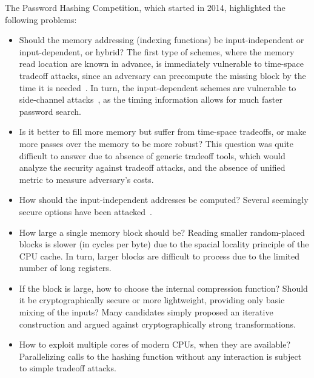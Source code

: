 \documentclass[a4paper]{article}
\begin{document}
The  Password Hashing Competition, which started in 2014,  highlighted the following problems:
\begin{itemize}
  \item Should the memory addressing (indexing functions) be input-independent or input-dependent, or hybrid? The first type of schemes, where the memory read location are known in advance, is immediately vulnerable to time-space tradeoff attacks,
 since an adversary can precompute the missing block by the time it is needed~\cite{trade-att}. In turn, the input-dependent schemes are vulnerable to side-channel attacks~\cite{RistenpartTSS09}, as the timing information allows for much faster password search.
  \item Is it better to fill more memory but suffer from time-space tradeoffs, or make more passes over the memory to be more robust? This question was quite difficult to answer due to absence of generic tradeoff tools, which would analyze the security against tradeoff attacks, and the absence of unified metric to measure adversary's costs.
          \item How should the input-independent addresses be computed? Several seemingly secure options have been attacked~\cite{trade-att}.
  \item How large a single memory block should be? Reading smaller random-placed blocks is slower (in cycles per byte) due to the spacial locality principle of the CPU cache. In turn, larger
  blocks are difficult to process due to the limited number of long registers.
  \item If the block is large, how to choose the internal compression function? Should it be cryptographically secure or more lightweight, providing only basic mixing of the inputs? Many candidates simply proposed an iterative construction  and argued against cryptographically strong transformations.

      \item How to exploit multiple cores of modern CPUs, when they are available? Parallelizing calls to the hashing function without any interaction is subject  to simple tradeoff attacks.
\end{itemize}
\end{document}
